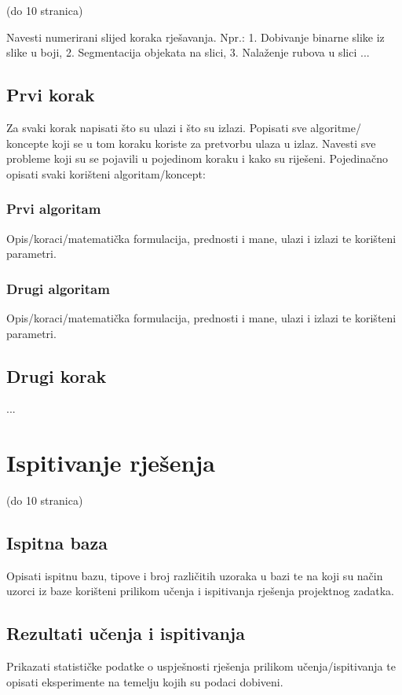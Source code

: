 \documentclass[times, utf8, diplomski]{fer}
\begin{document}
(do 10 stranica)

Navesti numerirani slijed koraka rješavanja. Npr.: 1. Dobivanje binarne slike iz slike u boji, 2. Segmentacija objekata na slici, 3. Nalaženje rubova u slici ...

\section{Prvi korak}

Za svaki korak napisati što su ulazi i što su izlazi. Popisati sve algoritme/ koncepte koji se u tom koraku koriste za pretvorbu ulaza u izlaz. Navesti sve probleme koji su se pojavili u pojedinom koraku i kako su riješeni. Pojedinačno opisati svaki korišteni algoritam/koncept:

\subsection{Prvi algoritam}
Opis/koraci/matematička formulacija, prednosti i mane, ulazi i izlazi te korišteni parametri.
\subsection{Drugi algoritam}
Opis/koraci/matematička formulacija, prednosti i mane, ulazi i izlazi te korišteni parametri.

\section{Drugi korak}
...

\chapter{Ispitivanje rješenja}
(do 10 stranica)

\section{Ispitna baza}
Opisati ispitnu bazu, tipove i broj različitih uzoraka u bazi te na koji su način uzorci iz baze korišteni prilikom učenja i ispitivanja rješenja projektnog zadatka. 

\section{Rezultati učenja i ispitivanja}
Prikazati statističke podatke o uspješnosti rješenja prilikom učenja/ispitivanja te opisati eksperimente na temelju kojih su podaci dobiveni.
\end{document}

